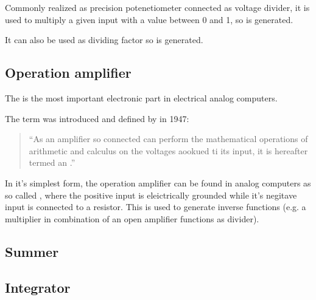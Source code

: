 \documentclass[letterpaper,10pt,english]{sphinxmanual}
\begin{document}
\sphinxAtStartPar
Commonly realized as precision potenetiometer connected as voltage divider, it is used to multiply a given input with a value between 0 and 1, so  is generated.

\sphinxAtStartPar
It can also be used as dividing factor so  is generated.

\sphinxAtStartPar
{}

\sphinxAtStartPar
{}


\subsection{Operation amplifier}
\label{\detokenize{rst/computing_elements/operationamp:operation-amplifier}}\label{\detokenize{rst/computing_elements/operationamp::doc}}
\sphinxAtStartPar
The  is the most important electronic part in electrical analog computers.

\sphinxAtStartPar
The term  was introduced and defined by  in 1947:
\begin{quote}

\sphinxAtStartPar
“As an amplifier so connected can perform the mathematical operations of arithmetic and calculus on the voltages aookued ti its input, it is hereafter termed an .”
\end{quote}

\sphinxAtStartPar
In it’s simplest form, the operation amplifier can be found in analog computers as so called , where the positive input is eleictrically grounded while it’s negitave input is connected to a resistor. This is used to generate inverse functions (e.g. a multiplier in combination of an open amplifier functions as divider).


\subsection{Summer}
\label{\detokenize{rst/computing_elements/summer:summer}}\label{\detokenize{rst/computing_elements/summer::doc}}

\subsection{Integrator}
\label{\detokenize{rst/computing_elements/integrator:integrator}}\label{\detokenize{rst/computing_elements/integrator::doc}}
\end{document}
